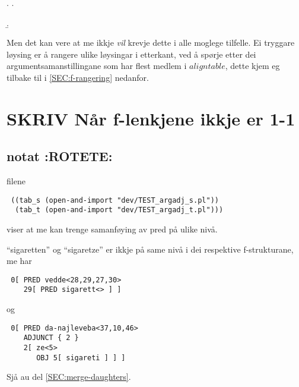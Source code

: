 \documentclass[11pt,a4paper,oneside,draft]{book}
\begin{document}
{\avmoptions{}

\ex. \a.  \begin{avm}    \end{avm}
  \b.\begin{avm}  \end{avm}

}

Men det kan vere at me ikkje \emph{vil} krevje dette i alle moglege
tilfelle. Ei tryggare løysing er å rangere ulike løysingar i
etterkant, ved å spørje etter dei argumentsamanstillingane som har
flest medlem i $aligntable$, dette kjem eg tilbake til i
\ref{SEC:f-rangering} nedanfor.

\section{\textbf{SKRIV} Når f-lenkjene ikkje er 1-1}
\label{sec-4.2}

\subsection{notat \textbf{:ROTETE:}}
\label{sec-4.2.1}

filene 
\begin{verbatim}
 ((tab_s (open-and-import "dev/TEST_argadj_s.pl"))
  (tab_t (open-and-import "dev/TEST_argadj_t.pl")))
\end{verbatim}

viser at me kan trenge samanføying av pred på ulike nivå.

``sigaretten'' og ``sigaretze'' er ikkje på same nivå i dei respektive
f-strukturane, me har
\begin{verbatim}
 0[ PRED vedde<28,29,27,30>
    29[ PRED sigarett<> ] ]
\end{verbatim}

og
\begin{verbatim}
 0[ PRED da-najleveba<37,10,46>
    ADJUNCT { 2 }
    2[ ze<5>
       OBJ 5[ sigareti ] ] ]
\end{verbatim}


Sjå au del \ref{SEC:merge-daughters}.
\end{document}
